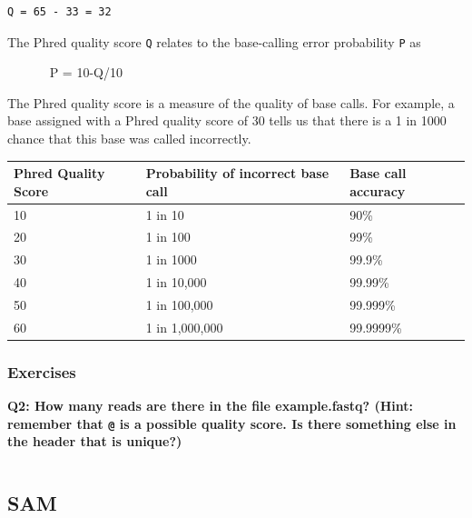 \documentclass[11pt]{article}
\makeatletter
\newcommand{\boxspacing}{\kern\kvtcb@left@rule\kern\kvtcb@boxsep}
\newcommand{\prompt}[4]{
        {\ttfamily\llap{{\color{#2}[#3]:\hspace{3pt}#4}}\vspace{-\baselineskip}}
    }
\makeatother
\begin{document}
\begin{verbatim}
Q = 65 - 33 = 32
\end{verbatim}

The Phred quality score \texttt{Q} relates to the base-calling error
probability \texttt{P} as

~~~~~~ P = 10-Q/10

The Phred quality score is a measure of the quality of base calls. For
example, a base assigned with a Phred quality score of 30 tells us that
there is a 1 in 1000 chance that this base was called incorrectly.

\begin{longtable}[]{@{}lll@{}}
\toprule
Phred Quality Score & Probability of incorrect base call & Base call
accuracy \\
\midrule
\endhead
10 & 1 in 10 & 90\% \\
20 & 1 in 100 & 99\% \\
30 & 1 in 1000 & 99.9\% \\
40 & 1 in 10,000 & 99.99\% \\
50 & 1 in 100,000 & 99.999\% \\
60 & 1 in 1,000,000 & 99.9999\% \\
\bottomrule
\end{longtable}

    \hypertarget{exercises}{%
\subsubsection{Exercises}\label{exercises}}

\textbf{Q2: How many reads are there in the file example.fastq? (Hint:
remember that \texttt{@} is a possible quality score. Is there something
else in the header that is unique?)}

    \begin{tcolorbox}[breakable, size=fbox, boxrule=1pt, pad at break*=1mm,colback=cellbackground, colframe=cellborder]
\prompt{In}{incolor}{ }{\boxspacing}
\begin{Verbatim}[commandchars=\\\{\}]

\end{Verbatim}
\end{tcolorbox}

    \hypertarget{sam}{%
\subsection{SAM}\label{sam}}
\end{document}
